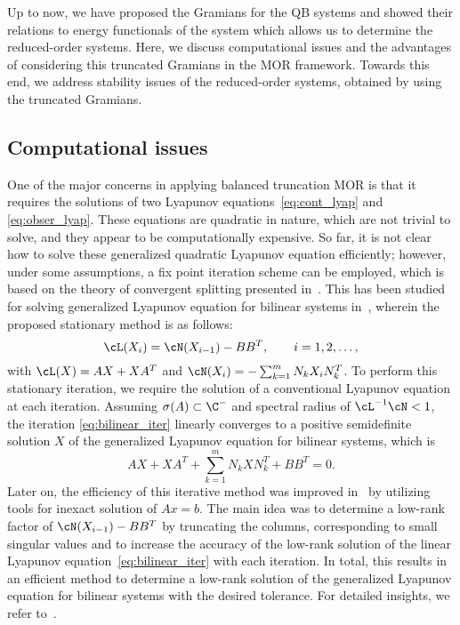 Up to now, we have proposed the Gramians for the QB systems and showed their relations to energy functionals of the system which allows us to determine the reduced-order systems. Here, we discuss computational issues and the advantages of considering this truncated Gramians in the MOR framework. Towards this end, we address stability issues of the reduced-order systems, obtained by using the truncated Gramians. 
\subsection{Computational issues}
One of the major concerns in applying balanced truncation MOR is that it requires the solutions of  two Lyapunov equations~\eqref{eq:cont_lyap} and \eqref{eq:obser_lyap}. These equations are quadratic in nature, which are not trivial to solve, and they appear to be computationally expensive. So far, it is not clear  how to solve these generalized quadratic  Lyapunov equation efficiently; however, under some assumptions,  a fix point iteration scheme can be employed, which is based on the theory of convergent splitting presented in~\cite{damm2001newton,schneider1965positive}. This has been studied for solving generalized Lyapunov equation for bilinear systems in~\cite{damm2008direct}, wherein the proposed stationary method is as follows:
\begin{equation}\label{eq:bilinear_iter}
\cL(X_i) = \cN(X_{i-1}) - BB^T, \qquad i = 1,2,\ldots,
\end{equation}
with $\cL(X) = AX + XA^T$ and $\cN(X_i) = -\sum_{k=1}^mN_kX_iN_k^T$. To perform this stationary iteration, we require the solution of a conventional Lyapunov equation at each iteration. Assuming $\sigma(A) \subset \C^{-}$ and spectral radius of $\cL^{-1}\cN<1$, the iteration \eqref{eq:bilinear_iter} linearly converges to a positive semidefinite solution $X$ of the generalized Lyapunov equation for bilinear systems, which is 
$$AX + XA^T + \sum_{k=1}^mN_kXN_k^T+BB^T = 0.$$
Later on, the efficiency of this iterative method was improved in~\cite{shank2014efficient} by utilizing  tools for inexact solution of $Ax = b$. The main idea was to determine a low-rank factor of $\cN(X_{i-1}) - BB^T$ by truncating the columns, corresponding to small singular values and to increase the accuracy of the low-rank solution of the linear Lyapunov equation~\eqref{eq:bilinear_iter}  with each iteration. In total, this results in an efficient method to determine a low-rank solution of the generalized Lyapunov equation for bilinear systems with the desired tolerance. For detailed insights, we refer to~\cite{shank2014efficient}.

